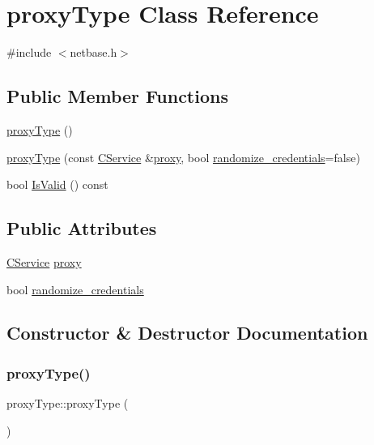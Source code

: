 \hypertarget{classproxy_type}{}\section{proxy\+Type Class Reference}
\label{classproxy_type}


{\ttfamily \#include $<$netbase.\+h$>$}

\subsection*{Public Member Functions}
\begin{DoxyCompactItemize}
\item 
\mbox{\hyperlink{classproxy_type_a60532d274fab77aad1ff5aa9965383eb}{proxy\+Type}} ()
\item 
\mbox{\hyperlink{classproxy_type_ab628e8a0b5e97f2c9f43d24d341600da}{proxy\+Type}} (const \mbox{\hyperlink{class_c_service}{C\+Service}} \&\mbox{\hyperlink{classproxy_type_a5bd2641d60e071671cbfe4f45e831743}{proxy}}, bool \mbox{\hyperlink{classproxy_type_ad2539071d9857374f3cd3313a93bef55}{randomize\+\_\+credentials}}=false)
\item 
bool \mbox{\hyperlink{classproxy_type_a3f3c9c016b103c8ff5e61d115c188b36}{Is\+Valid}} () const
\end{DoxyCompactItemize}
\subsection*{Public Attributes}
\begin{DoxyCompactItemize}
\item 
\mbox{\hyperlink{class_c_service}{C\+Service}} \mbox{\hyperlink{classproxy_type_a5bd2641d60e071671cbfe4f45e831743}{proxy}}
\item 
bool \mbox{\hyperlink{classproxy_type_ad2539071d9857374f3cd3313a93bef55}{randomize\+\_\+credentials}}
\end{DoxyCompactItemize}


\subsection{Constructor \& Destructor Documentation}
\mbox{\label{classproxy_type_a60532d274fab77aad1ff5aa9965383eb}} 
\subsubsection{\texorpdfstring{proxy\+Type()}{proxyType()}\hspace{0.1cm}{\footnotesize\ttfamily [1/2]}}
{\footnotesize\ttfamily proxy\+Type\+::proxy\+Type (\begin{DoxyParamCaption}{ }\end{DoxyParamCaption})\hspace{0.3cm}{\ttfamily [inline]}}

